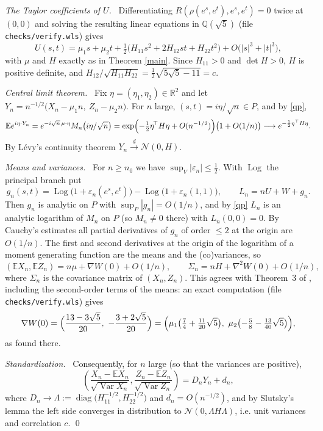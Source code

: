 \documentclass[11pt]{amsart}
\newcommand{\step}[1]{\par\medskip\noindent\emph{#1}\ }
\theoremstyle{remark}
\newcommand{\E}{\mathbb{E}}
\newcommand{\Var}{\operatorname{Var}}
\newcommand{\R}{\mathbb{R}}
\begin{document}
\step{The Taylor coefficients of $U$.} Differentiating $R(\rho(e^s,e^t),e^s,e^t)=0$ twice at $(0,0)$ and
solving the resulting linear equations in $\mathbb Q(\sqrt5)$ (file \texttt{checks/verify.wls}) gives
\[
U(s,t)=\mu_1s+\mu_2t+\tfrac12\bigl(H_{11}s^2+2H_{12}st+H_{22}t^2\bigr)+O\bigl(|s|^3+|t|^3\bigr),
\]
with $\mu$ and $H$ exactly as in Theorem \ref{main}. Since $H_{11}>0$ and $\det H>0$, $H$ is positive definite, and
$H_{12}/\sqrt{H_{11}H_{22}}=\tfrac12\sqrt{5\sqrt5-11}=c$.

\step{Central limit theorem.} Fix $\eta=(\eta_1,\eta_2)\in\R^2$ and let
$Y_n=n^{-1/2}\bigl(X_n-\mu_1n,\ Z_n-\mu_2n\bigr)$. For $n$ large, $(s,t)=i\eta/\sqrt n\in P$, and by \eqref{qp},
\[
\E e^{i\eta\cdot Y_n}=e^{-i\sqrt n\,\mu\cdot\eta}M_n\bigl(i\eta/\sqrt n\bigr)
=\exp\Bigl(-\tfrac12\eta^{\!\top}H\eta+O(n^{-1/2})\Bigr)\bigl(1+O(1/n)\bigr)\longrightarrow e^{-\frac12\eta^{\top}H\eta}.
\]
By L\'evy's continuity theorem $Y_n\xrightarrow{d}\mathcal N(0,H)$.

\step{Means and variances.} For $n\ge n_0$ we have $\sup_V|\varepsilon_n|\le\frac12$. With $\operatorname{Log}$
the principal branch put
\[
g_n(s,t)=\operatorname{Log}\bigl(1+\varepsilon_n(e^s,e^t)\bigr)-\operatorname{Log}\bigl(1+\varepsilon_n(1,1)\bigr),\qquad
L_n=nU+W+g_n .
\]
Then $g_n$ is analytic on $P$ with $\sup_P|g_n|=O(1/n)$, and by \eqref{qp} $L_n$ is an analytic logarithm of $M_n$ on $P$
(so $M_n\neq0$ there) with $L_n(0,0)=0$. By Cauchy's estimates all partial derivatives of $g_n$ of order $\le2$ at the
origin are $O(1/n)$. The first and second derivatives at the origin of the logarithm of a moment generating function
are the means and the (co)variances, so
\[
(\E X_n,\E Z_n)=n\mu+\nabla W(0)+O(1/n),\qquad \Sigma_n=nH+\nabla^2W(0)+O(1/n),
\]
where $\Sigma_n$ is the covariance matrix of $(X_n,Z_n)$. This agrees with Theorem~3 of \cite{BKZ}, including the
second-order terms of the means: an exact computation (file \texttt{checks/verify.wls}) gives
\[
\nabla W(0)=\Bigl(\frac{13-3\sqrt5}{20},\ -\frac{3+2\sqrt5}{20}\Bigr)
=\Bigl(\mu_1\bigl(\tfrac74+\tfrac{11}{20}\sqrt5\bigr),\ \mu_2\bigl(-\tfrac58-\tfrac{13}{40}\sqrt5\bigr)\Bigr),
\]
as found there.

\step{Standardization.} Consequently, for $n$ large (so that the variances are positive),
\[
\left(\frac{X_n-\E X_n}{\sqrt{\Var X_n}},\frac{Z_n-\E Z_n}{\sqrt{\Var Z_n}}\right)=D_nY_n+d_n,
\]
where $D_n\to\Lambda:=\operatorname{diag}\bigl(H_{11}^{-1/2},H_{22}^{-1/2}\bigr)$ and $d_n=O(n^{-1/2})$,
and by Slutsky's lemma the left side converges in distribution to $\mathcal N(0,\Lambda H\Lambda)$, i.e. unit variances and correlation $c$. \qed
\end{document}
